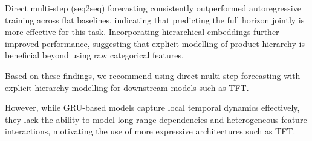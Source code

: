 Direct multi-step (seq2seq) forecasting consistently outperformed autoregressive training across flat baselines, indicating that predicting the full horizon jointly is more effective for this task. Incorporating hierarchical embeddings further improved performance, suggesting that explicit modelling of product hierarchy is beneficial beyond using raw categorical features.

Based on these findings, we recommend using direct multi-step forecasting with explicit hierarchy modelling for downstream models such as TFT.

However, while GRU-based models capture local temporal dynamics effectively, they lack the ability to model long-range dependencies and heterogeneous feature interactions, motivating the use of more expressive architectures such as TFT.